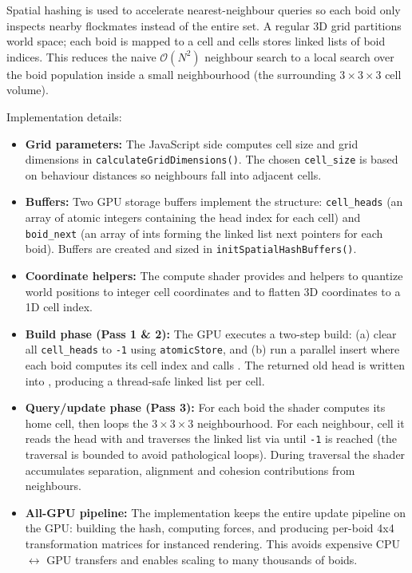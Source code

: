 \documentclass[a4paper, 12pt]{article}
\begin{document}
Spatial hashing is used to accelerate nearest-neighbour queries so each boid
only inspects nearby flockmates instead of the entire set. A regular 3D grid
partitions world space; each boid is mapped to a cell and cells stores linked
lists of boid indices. This reduces the naive $\mathcal{O}(N^2)$ neighbour
search to a local search over the boid population inside a small neighbourhood
(the surrounding $3 \times 3 \times 3$ cell volume).

Implementation details:
\begin{itemize}
    \item \textbf{Grid parameters:} The JavaScript side computes cell size and grid dimensions in \texttt{calculateGridDimensions()}. The chosen \texttt{cell\_size} is based on behaviour distances so neighbours fall into adjacent cells.
    
    \item \textbf{Buffers:} Two GPU storage buffers implement the structure: \texttt{cell\_heads} (an array of atomic integers containing the head index for each cell) and \texttt{boid\_next} (an array of ints forming the linked list next pointers for each boid). Buffers are created and sized in \texttt{initSpatialHashBuffers()}.
    
    \item \textbf{Coordinate helpers:} The compute shader provides  and  helpers to quantize world positions to integer cell coordinates and to flatten 3D coordinates to a 1D cell index.
    
    \item \textbf{Build phase (Pass 1 \& 2):} The GPU executes a two-step build: (a) clear all \texttt{cell\_heads} to \texttt{-1} using \texttt{atomicStore}, and (b) run a parallel insert where each boid computes its cell index and calls . The returned old head is written into , producing a thread-safe linked list per cell.
    
    \item \textbf{Query/update phase (Pass 3):} For each boid the shader computes its home cell, then loops the $3 \times 3 \times 3$ neighbourhood. For each neighbour, cell it reads the head with  and traverses the linked list via  until \texttt{-1} is reached (the traversal is bounded to avoid pathological loops). During traversal the shader accumulates separation, alignment and cohesion contributions from neighbours.
    
    \item \textbf{All-GPU pipeline:} The implementation keeps the entire update pipeline on the GPU: building the hash, computing forces, and producing per-boid 4x4 transformation matrices for instanced rendering. This avoids expensive CPU $\leftrightarrow$ GPU transfers and enables scaling to many thousands of boids.
\end{itemize}
\end{document}
